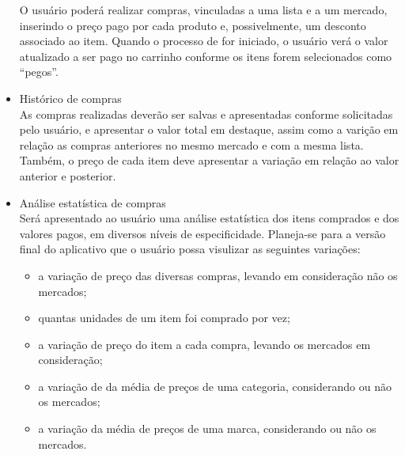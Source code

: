 \begin{itemize}
  O usuário poderá realizar compras, vinculadas a uma lista e a um
  mercado, inserindo o preço pago por cada produto e, possivelmente,
  um desconto associado ao item. Quando o processo de for iniciado, o
  usuário verá o valor atualizado a ser pago no carrinho conforme os
  itens forem selecionados como ``pegos''.
\item Histórico de compras\\
  As compras realizadas deverão ser salvas e apresentadas conforme
  solicitadas pelo usuário, e apresentar o valor total em destaque,
  assim como a varição em relação as compras anteriores no mesmo
  mercado e com a mesma lista. Também, o preço de cada item deve
  apresentar a variação em relação ao valor anterior e posterior.
\item Análise estatística de compras\\
  Será apresentado ao usuário uma análise estatística dos itens
  comprados e dos valores pagos, em diversos níveis de
  especificidade. Planeja-se para a versão final do aplicativo que o
  usuário possa visulizar as seguintes variações:
  \begin{itemize}
  \item a variação de preço das diversas compras, levando em
    consideração \DIFdelbegin {}\DIFdelend \DIFaddbegin {}\DIFaddend não os mercados;
  \item quantas unidades de um item foi comprado por vez;
  \item a variação de preço do item a cada compra, levando os mercados
    em consideração;
  \item a variação de da média de preços de uma categoria,
    considerando ou não os mercados;
  \item a variação da média de preços de uma marca, considerando ou
    não os mercados.
  \end{itemize}
\end{itemize}

